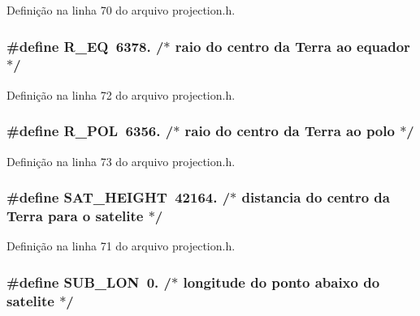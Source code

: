 Definição na linha 70 do arquivo projection.\+h.

\subsubsection[{R\+\_\+\+EQ}]{\setlength{\rightskip}{0pt plus 5cm}\#define R\+\_\+\+EQ~6378.           /$\ast$ raio do centro da Terra ao equador               $\ast$/}\label{group___network_ga4781739f52b3000874380adae8279eaa}


Definição na linha 72 do arquivo projection.\+h.

\subsubsection[{R\+\_\+\+P\+OL}]{\setlength{\rightskip}{0pt plus 5cm}\#define R\+\_\+\+P\+OL~6356.          /$\ast$ raio do centro da Terra ao polo                  $\ast$/}\label{group___network_ga01e90bb100712e6e798f8babd7c31fb6}


Definição na linha 73 do arquivo projection.\+h.

\subsubsection[{S\+A\+T\+\_\+\+H\+E\+I\+G\+HT}]{\setlength{\rightskip}{0pt plus 5cm}\#define S\+A\+T\+\_\+\+H\+E\+I\+G\+HT~42164.             /$\ast$ distancia do centro da Terra para o satelite     $\ast$/}\label{group___network_ga6084f5ed03536c34d1f6a18a426ad5eb}


Definição na linha 71 do arquivo projection.\+h.

\subsubsection[{S\+U\+B\+\_\+\+L\+ON}]{\setlength{\rightskip}{0pt plus 5cm}\#define S\+U\+B\+\_\+\+L\+ON~0.             /$\ast$ longitude do ponto abaixo do satelite            $\ast$/}\label{group___network_ga68c229eef5fa622bca6d5f6c2f6c8e79}


